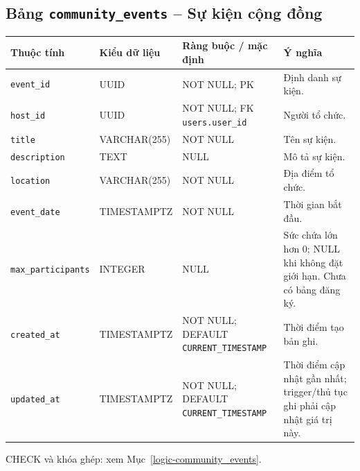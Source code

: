 \subsection{Bảng \texttt{community\_\allowbreak{}events} -- Sự kiện cộng đồng}
\label{dictionary-community_events}
\begingroup
\footnotesize
\setlength{\tabcolsep}{3pt}
\begin{longtable}{>{\raggedright\arraybackslash}p{3.1cm}>{\raggedright\arraybackslash}p{2.5cm}>{\raggedright\arraybackslash}p{3.7cm}>{\raggedright\arraybackslash}p{4.3cm}}
\toprule
Thuộc tính & Kiểu dữ liệu & Ràng buộc / mặc định & Ý nghĩa \\
\midrule
\endhead
\texttt{event\_\allowbreak{}id} & UUID & NOT NULL; PK & Định danh sự kiện. \\
\texttt{host\_\allowbreak{}id} & UUID & NOT NULL; FK \texttt{users.user\_\allowbreak{}id} & Người tổ chức. \\
\texttt{title} & VARCHAR(255) & NOT NULL & Tên sự kiện. \\
\texttt{description} & TEXT & NULL & Mô tả sự kiện. \\
\texttt{location} & VARCHAR(255) & NOT NULL & Địa điểm tổ chức. \\
\texttt{event\_\allowbreak{}date} & TIMESTAMPTZ & NOT NULL & Thời gian bắt đầu. \\
\texttt{max\_\allowbreak{}participants} & INTEGER & NULL & Sức chứa lớn hơn 0; NULL khi không đặt giới hạn. Chưa có bảng đăng ký. \\
\texttt{created\_\allowbreak{}at} & TIMESTAMPTZ & NOT NULL; DEFAULT \texttt{CURRENT\_\allowbreak{}TIMESTAMP} & Thời điểm tạo bản ghi. \\
\texttt{updated\_\allowbreak{}at} & TIMESTAMPTZ & NOT NULL; DEFAULT \texttt{CURRENT\_\allowbreak{}TIMESTAMP} & Thời điểm cập nhật gần nhất; trigger/thủ tục ghi phải cập nhật giá trị này. \\
\bottomrule
\end{longtable}
\endgroup
CHECK và khóa ghép: xem Mục~\ref{logic-community_events}.
